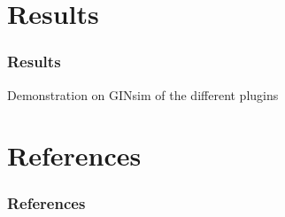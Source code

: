 \documentclass{beamer}
\begin{document}
\section{Results}

\begin{frame}
  \frametitle{Results}
  \begin{center}
    Demonstration on GINsim of the different plugins
  \end{center}
\end{frame}


\section*{References}

\begin{frame}
  \frametitle{References}
  
  
\end{frame}
\end{document}
